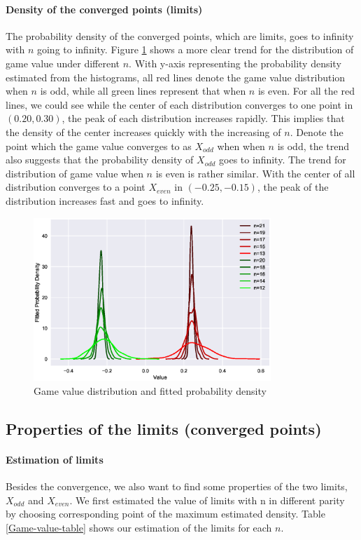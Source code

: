 \documentclass[a4paper,english]{article}
\begin{document}
\begin{spacing}{1.4}
\paragraph{Density of the converged points (limits)}
The probability density of the converged points, which are limits, goes to infinity with $n$ going to infinity.
Figure \ref{game-value-pdf} shows a more clear trend for the distribution of game value under different $n$. With y-axis representing the probability density estimated from the histograms, all red lines denote the game value distribution when $n$ is odd, while all green lines represent that when $n$ is even. For all the red lines, we could see while the center of each distribution converges to one point in $(0.20,0.30)$, the peak of each distribution increases rapidly. This implies that the density of the center increases quickly with the increasing of $n$. Denote the point which the game value converges to as $X_{odd}$ when when $n$ is odd, the trend also suggests that the probability density of $X_{odd}$ goes to infinity. The trend for distribution of game value when $n$ is even is rather similar. With the center of all distribution converges to a point $X_{even}$ in $(-0.25, -0.15)$, the peak of the distribution increases fast and goes to infinity.
\begin{figure}[!htb]
\centering
\includegraphics[width=0.8\textwidth]{figures/plot4.eps}
\caption{Game value distribution and fitted probability density}
\label{game-value-pdf}
\end{figure}

\subsection{Properties of the limits (converged points)}
\paragraph{Estimation of limits}
Besides the convergence, we also want to find some properties of the two limits, $X_{odd}$ and $X_{even}$. We first estimated the value of limits with n in different parity by choosing corresponding point of the maximum estimated density. Table \ref{Game-value-table} shows our estimation of the limits for each $n$.


\end{spacing}
\end{document}
